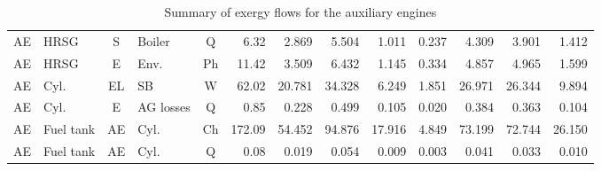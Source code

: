 \documentclass[preprint,12pt]{elsarticle}
\begin{document}
\begin{table}[hbp!]
{\begin{tabular}{clclcrrrrrrrr}
AE & HRSG & S & Boiler & Q & 6.32 & 2.869 & 5.504 & 1.011 & 0.237 & 4.309 & 3.901 & 1.412\\
AE & HRSG & E & Env. & Ph & 11.42 & 3.509 & 6.432 & 1.145 & 0.334 & 4.857 & 4.965 & 1.599\\
AE & Cyl. & EL & SB & W & 62.02 & 20.781 & 34.328 & 6.249 & 1.851 & 26.971 & 26.344 & 9.894\\
AE & Cyl. & E & AG losses & Q & 0.85 & 0.228 & 0.499 & 0.105 & 0.020 & 0.384 & 0.363 & 0.104\\
AE & Fuel tank & AE & Cyl. & Ch & 172.09 & 54.452 & 94.876 & 17.916 & 4.849 & 73.199 & 72.744 & 26.150\\
AE & Fuel tank & AE & Cyl. & Q & 0.08 & 0.019 & 0.054 & 0.009 & 0.003 & 0.041 & 0.033 & 0.010\\
\bottomrule
\end{tabular}}
\caption{Summary of exergy flows for the auxiliary engines}
\label{tab:flows:ex:AE}
\end{table}
\end{document}
